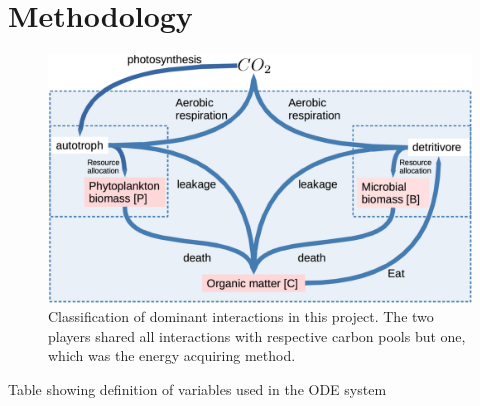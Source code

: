 \documentclass[../thesis.tex]{subfiles} %
\begin{document}
\section{Methodology}

\begin{figure}[H]
    \centering
    \includegraphics[width=.8\linewidth]{result/model.png}
    \caption[Model visualization]{Classification of dominant interactions in this project.  The two players shared all interactions with respective carbon pools but one, which was the energy acquiring method.}
    \label{modelInWord}
\end{figure}

\begin{table}[H]
    \centering
    \caption[Algebra variables definitions]{Table showing definition of variables used in the ODE system}    
    \label{varInTab}
\end{table}
\end{document}
